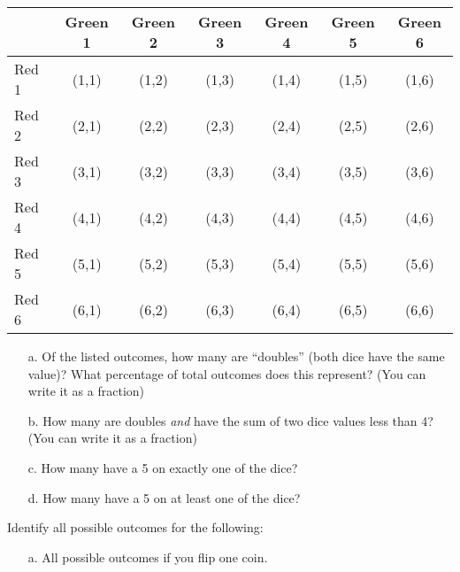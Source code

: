 {\begin{questionNOGRADE}{\thequestion}
        \begin{tabular}{ l | c c c c c c }
            & Green 1 & Green 2 & Green 3 & Green 4 & Green 5 & Green 6 \\ \hline
            Red 1 & (1,1) & (1,2) & (1,3) & (1,4) & (1,5) & (1,6) \\
            Red 2 & (2,1) & (2,2) & (2,3) & (2,4) & (2,5) & (2,6) \\
            Red 3 & (3,1) & (3,2) & (3,3) & (3,4) & (3,5) & (3,6) \\
            Red 4 & (4,1) & (4,2) & (4,3) & (4,4) & (4,5) & (4,6) \\
            Red 5 & (5,1) & (5,2) & (5,3) & (5,4) & (5,5) & (5,6) \\
            Red 6 & (6,1) & (6,2) & (6,3) & (6,4) & (6,5) & (6,6) \\
            
        \end{tabular}

        \begin{enumerate}
            \item[a.]   Of the listed outcomes, how many are ``doubles''
                        (both dice have the same value)? What percentage of
                        total outcomes does this represent?
                        (You can write it as a fraction)

            \item[b.]   How many are doubles \textit{and} have the sum
                        of two dice values less than 4?
                        (You can write it as a fraction)

            \item[c.]   How many have a 5 on exactly one of the dice?

            \item[d.]   How many have a 5 on at least one of the dice?
        \end{enumerate}
        
    \end{questionNOGRADE}

    \hrulefill

    \begin{questionNOGRADE}{\thequestion}

        Identify all possible outcomes for the following:

        \begin{enumerate}
            \item[a.]   All possible outcomes if you flip one coin.
            

\end{enumerate}
\end{questionNOGRADE}}
